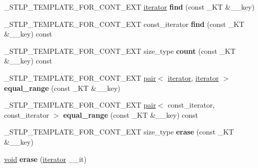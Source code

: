 \begin{DoxyCompactItemize}
\mbox{\label{classhash__set_a10a774250d70e7bc6883e6e3eb15a2ca}} 
\+\_\+\+S\+T\+L\+P\+\_\+\+T\+E\+M\+P\+L\+A\+T\+E\+\_\+\+F\+O\+R\+\_\+\+C\+O\+N\+T\+\_\+\+E\+XT \hyperlink{structiterator}{iterator} {\bfseries find} (const \+\_\+\+KT \&\+\_\+\+\_\+key)
\item 
\mbox{\label{classhash__set_a2cd9aa08a243ef742d94f9ce81ddea7b}} 
\+\_\+\+S\+T\+L\+P\+\_\+\+T\+E\+M\+P\+L\+A\+T\+E\+\_\+\+F\+O\+R\+\_\+\+C\+O\+N\+T\+\_\+\+E\+XT const\+\_\+iterator {\bfseries find} (const \+\_\+\+KT \&\+\_\+\+\_\+key) const
\item 
\mbox{\label{classhash__set_aef167d085b6da013519305d05e356299}} 
\+\_\+\+S\+T\+L\+P\+\_\+\+T\+E\+M\+P\+L\+A\+T\+E\+\_\+\+F\+O\+R\+\_\+\+C\+O\+N\+T\+\_\+\+E\+XT size\+\_\+type {\bfseries count} (const \+\_\+\+KT \&\+\_\+\+\_\+key) const
\item 
\mbox{\label{classhash__set_a03d75dd4b3b0d35cc281c327886c88d3}} 
\+\_\+\+S\+T\+L\+P\+\_\+\+T\+E\+M\+P\+L\+A\+T\+E\+\_\+\+F\+O\+R\+\_\+\+C\+O\+N\+T\+\_\+\+E\+XT \hyperlink{structpair}{pair}$<$ \hyperlink{structiterator}{iterator}, \hyperlink{structiterator}{iterator} $>$ {\bfseries equal\+\_\+range} (const \+\_\+\+KT \&\+\_\+\+\_\+key)
\item 
\mbox{\label{classhash__set_afa8f822c6d13a8600f5d9a91b39e2f97}} 
\+\_\+\+S\+T\+L\+P\+\_\+\+T\+E\+M\+P\+L\+A\+T\+E\+\_\+\+F\+O\+R\+\_\+\+C\+O\+N\+T\+\_\+\+E\+XT \hyperlink{structpair}{pair}$<$ const\+\_\+iterator, const\+\_\+iterator $>$ {\bfseries equal\+\_\+range} (const \+\_\+\+KT \&\+\_\+\+\_\+key) const
\item 
\mbox{\label{classhash__set_aca62a69d52a0031c63ad8408bd80d791}} 
\+\_\+\+S\+T\+L\+P\+\_\+\+T\+E\+M\+P\+L\+A\+T\+E\+\_\+\+F\+O\+R\+\_\+\+C\+O\+N\+T\+\_\+\+E\+XT size\+\_\+type {\bfseries erase} (const \+\_\+\+KT \&\+\_\+\+\_\+key)
\item 
\mbox{\label{classhash__set_aa55ba8ff80f92de1e2b1ce66e06365a4}} 
\hyperlink{interfacevoid}{void} {\bfseries erase} (\hyperlink{structiterator}{iterator} \+\_\+\+\_\+it)
\item 
\mbox{\label{classhash__set_aa87865564eae181c0f803864fff45ac7}} 

\end{DoxyCompactItemize}

